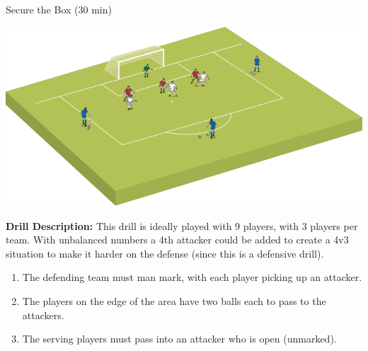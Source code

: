 \begin{evenBlock}{Secure the Box (30 min)}

\begin{minipage}[t]{\linewidth}
    \centering
    
    \begin{minipage}{.3\linewidth} %
        \includegraphics[width=\textwidth]{../img/Trimmed/SecureTheBox1}
    \end{minipage}
    \hspace{0.05\linewidth}
    \begin{minipage}{.6\linewidth} %
        \textbf{Drill Description:}
        This drill is ideally played with 9 players, with 3 players per team.  With unbalanced numbers a 4th attacker could be added to create a 4v3 situation to make it harder on the defense (since this is a defensive drill).
        \begin{enumerate}
            \setlength{\itemsep}{0pt}
            \setlength{\parskip}{0pt}
            \setlength{\parsep}{0pt}
            \item The defending team must man mark, with each player picking up an attacker.
            \item The players on the edge of the area have two balls each to pass to the attackers.
            \item The serving players must pass into an attacker who is open (unmarked).
        \end{enumerate}
        

\end{minipage}
\end{minipage}
\end{evenBlock}
